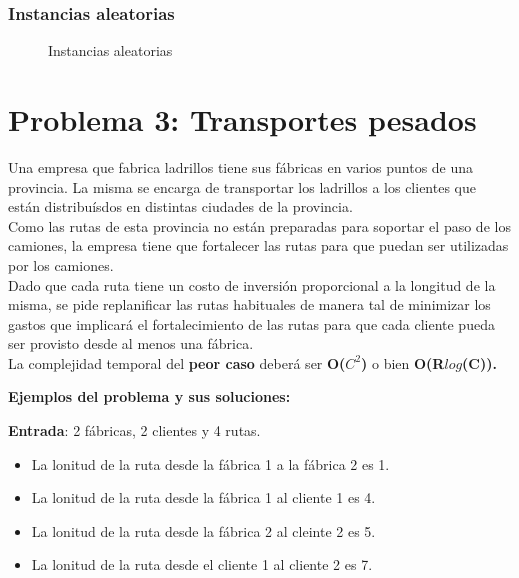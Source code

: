 \documentclass[a4paper, 10pt, twoside]{article}
\newcommand{\dosgraficos}[2]{
    \newcommand{\separacion}{-2.2em}
    \vspace{\separacion}
    
    \vspace{\separacion}
    
}
\begin{document}
\subsubsection{Instancias aleatorias}

\begin{figure}[H]
  \centering
  \dosgraficos{problema2-instancias-aleatorias}
              {problema2-instancias-aleatorias-n}
  \caption{Instancias aleatorias}
\end{figure}





\newpage

\section{Problema 3: Transportes pesados}

Una empresa que fabrica ladrillos tiene sus fábricas en varios puntos de una provincia. La misma se encarga de transportar los ladrillos a los clientes que están distribuísdos en distintas ciudades de la provincia.\\
Como las rutas de esta provincia no están preparadas para soportar el paso de los camiones, la empresa tiene que fortalecer las rutas para que puedan ser utilizadas por los camiones.\\
Dado que cada ruta tiene un costo de inversión proporcional a la longitud de la misma, se pide replanificar las rutas habituales de manera tal de minimizar los gastos que implicará el fortalecimiento de las rutas para que cada cliente pueda ser provisto desde al menos una fábrica.\\
La complejidad temporal del \textbf{peor caso} deberá ser \textbf{O($C^2$)} o bien \textbf{O(R$log$(C)).}

\textbf{Ejemplos del problema y sus soluciones:}

\textbf{Entrada}: 2 fábricas, 2 clientes y 4 rutas.
\begin{itemize}
\item{La lonitud de la ruta desde la fábrica 1 a la fábrica 2 es 1.}
\item{La lonitud de la ruta desde la fábrica 1 al cliente 1 es 4.}
\item{La lonitud de la ruta desde la fábrica 2 al cleinte 2 es 5.}
\item{La lonitud de la ruta desde el cliente 1 al cliente 2 es 7.}
\end{itemize}
\end{document}
